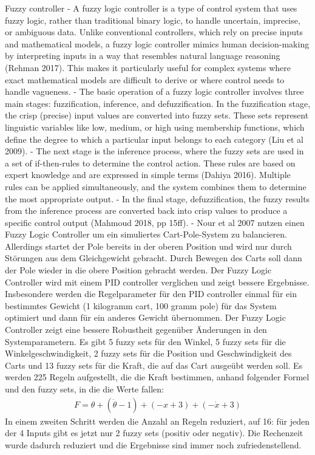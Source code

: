 Fuzzy controller
- A fuzzy logic controller is a type of control system that uses fuzzy logic, rather than traditional binary logic, to handle uncertain, imprecise, or ambiguous data. Unlike conventional controllers, which rely on precise inputs and mathematical models, a fuzzy logic controller mimics human decision-making by interpreting inputs in a way that resembles natural language reasoning (Rehman 2017). This makes it particularly useful for complex systems where exact mathematical models are difficult to derive or where control needs to handle vagueness.
- The basic operation of a fuzzy logic controller involves three main stages: fuzzification, inference, and defuzzification. In the fuzzification stage, the crisp (precise) input values are converted into fuzzy sets. These sets represent linguistic variables like low, medium, or high using membership functions, which define the degree to which a particular input belongs to each category (Liu et al 2009).
- The next stage is the inference process, where the fuzzy sets are used in a set of if-then-rules to determine the control action. These rules are based on expert knowledge and are expressed in simple terms (Dahiya 2016). Multiple rules can be applied simultaneously, and the system combines them to determine the most appropriate output.
- In the final stage, defuzzification, the fuzzy results from the inference process are converted back into crisp values to produce a specific control output (Mahmoud 2018, pp 15ff).
- Nour et al 2007 nutzen einen Fuzzy Logic Controller um ein simuliertes Cart-Pole-System zu balancieren. Allerdings startet der Pole bereits in der oberen Position und wird nur durch Störungen aus dem Gleichgewicht gebracht. Durch Bewegen des Carts soll dann der Pole wieder in die obere Position gebracht werden. Der Fuzzy Logic Controller wird mit einem PID controller verglichen und zeigt bessere Ergebnisse. Insbesondere werden die Regelparameter für den PID controller einmal für ein bestimmtes Gewicht (1 kilogramm cart, 100 gramm pole) für das System optimiert und dann für ein anderes Gewicht übernommen. Der Fuzzy Logic Controller zeigt eine bessere Robustheit gegenüber Änderungen in den Systemparametern. Es gibt 5 fuzzy sets für den Winkel, 5 fuzzy sets für die Winkelgeschwindigkeit, 2 fuzzy sets für die Position und Geschwindigkeit des Carts und 13 fuzzy sets für die Kraft, die auf das Cart ausgeübt werden soll. Es werden 225 Regeln aufgestellt, die die Kraft bestimmen, anhand folgender Formel und den fuzzy sets, in die die Werte fallen:
\begin{align}
    F = \theta + (\dot{\theta}-1) + (-x+3) + (-\dot{x}+3)
\end{align}
In einem zweiten Schritt werden die Anzahl an Regeln reduziert, auf 16: für jeden der 4 Inputs gibt es jetzt nur 2 fuzzy sets (positiv oder negativ). Die Rechenzeit wurde dadurch reduziert und die Ergebnisse sind immer noch zufriedenstellend.

